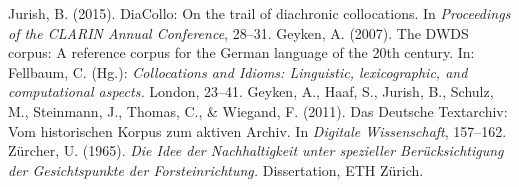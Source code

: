 \documentclass[
    german,
    a4paper,%
    12pt,%
    oneside,%
    toc=bibliography,
    final,
]{scrartcl}
\begin{document}
\newpage
\begin{thebibliography}{9}


 Jurish, B. (2015). DiaCollo: On the trail of diachronic collocations. In \textit{Proceedings of the CLARIN Annual Conference}, 28–31.
 Geyken, A. (2007). The DWDS corpus: A reference corpus for the German language of the 20th century. In: Fellbaum, C. (Hg.): \textit{Collocations and Idioms: Linguistic, lexicographic, and computational aspects.} London, 23–41.
 Geyken, A., Haaf, S., Jurish, B., Schulz, M., Steinmann, J., Thomas, C., \& Wiegand, F. (2011). Das Deutsche Textarchiv: Vom historischen Korpus zum aktiven Archiv. In \textit{Digitale Wissenschaft}, 157–162.
 Zürcher, U. (1965). \textit{Die Idee der Nachhaltigkeit unter spezieller Berücksichtigung der Gesichtspunkte der Forsteinrichtung.} Dissertation, ETH Zürich.

\end{thebibliography}
\end{document}
